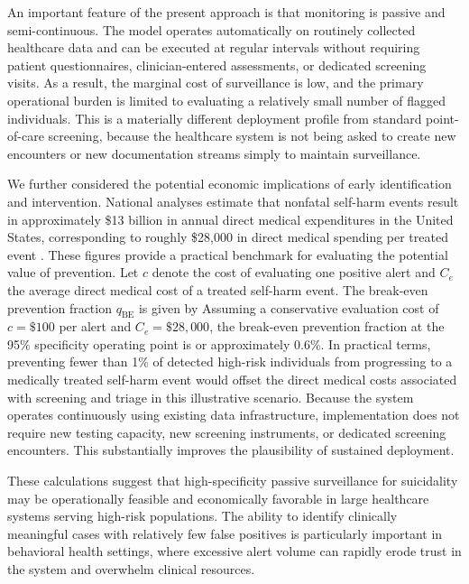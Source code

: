 \documentclass[onecolumn, compsoc,11pt]{IEEEtran}
\begin{document}
An important feature of the present approach is that monitoring is passive and semi-continuous. The model operates automatically on routinely collected healthcare data and can be executed at regular intervals without requiring patient questionnaires, clinician-entered assessments, or dedicated screening visits. As a result, the marginal cost of surveillance is low, and the primary operational burden is limited to evaluating a relatively small number of flagged individuals. This is a materially different deployment profile from standard point-of-care screening, because the healthcare system is not being asked to create new encounters or new documentation streams simply to maintain surveillance.

We further considered the potential economic implications of early identification and intervention. National analyses estimate that nonfatal self-harm events result in approximately \$13 billion in annual direct medical expenditures in the United States, corresponding to roughly \$28{,}000 in direct medical spending per treated event \cite{Peterson_2024_SelfHarmCosts}. These figures provide a practical benchmark for evaluating the potential value of prevention. Let $c$ denote the cost of evaluating one positive alert and $C_e$ the average direct medical cost of a treated self-harm event. The break-even prevention fraction $q_{\mathrm{BE}}$ is given by
Assuming a conservative evaluation cost of $c = \$100$ per alert and $C_e = \$28{,}000$, the break-even prevention fraction at the 95\% specificity operating point is
or approximately 0.6\%. In practical terms, preventing fewer than 1\% of detected high-risk individuals from progressing to a medically treated self-harm event would offset the direct medical costs associated with screening and triage in this illustrative scenario. Because the system operates continuously using existing data infrastructure, implementation does not require new testing capacity, new screening instruments, or dedicated screening encounters. This substantially improves the plausibility of sustained deployment.

These calculations suggest that high-specificity passive surveillance for suicidality may be operationally feasible and economically favorable in large healthcare systems serving high-risk populations. The ability to identify clinically meaningful cases with relatively few false positives is particularly important in behavioral health settings, where excessive alert volume can rapidly erode trust in the system and overwhelm clinical resources.
\end{document}

